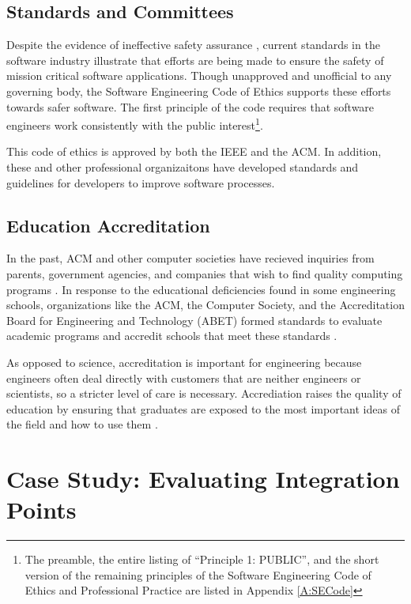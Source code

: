 \subsection{Standards and Committees}
Despite the evidence of ineffective safety assurance \cite{Therac25,Maisel05},
current standards in the software industry illustrate that efforts are being
made to ensure the safety of mission critical software applications. Though
unapproved and unofficial to any governing body, the Software Engineering Code
of Ethics supports these efforts towards safer software. The first principle of
the code requires that software engineers work consistently with the public
interest\footnote{The preamble, the entire listing of ``Principle 1: PUBLIC'',
and the short version of the remaining principles of the Software Engineering
Code of Ethics and Professional Practice are listed in Appendix \ref{A:SECode}}.

This code of ethics is approved by both the IEEE and the ACM. In addition, these
and other professional organizaitons  have developed standards and guidelines
for developers to improve software processes.


\subsection{Education Accreditation}

In the past, ACM and other computer societies have recieved inquiries from
parents, government agencies, and companies that wish to find quality computing
programs \cite{Mulder84}. In response to the educational deficiencies found in
some engineering schools, organizations like the ACM, the Computer Society, and
the Accreditation Board for Engineering and Technology (ABET) formed standards
to evaluate academic programs and accredit schools that meet these standards
\cite{ABET,Mulder84}.

As opposed to science, accreditation is important for engineering because
engineers often deal directly with customers that are neither engineers or
scientists, so a stricter level of care is necessary. Accrediation raises the
quality of education by ensuring that graduates are exposed to the most
important ideas of the field and how to use them \cite{Parnas98}.

\section{Case Study: Evaluating Integration Points}


